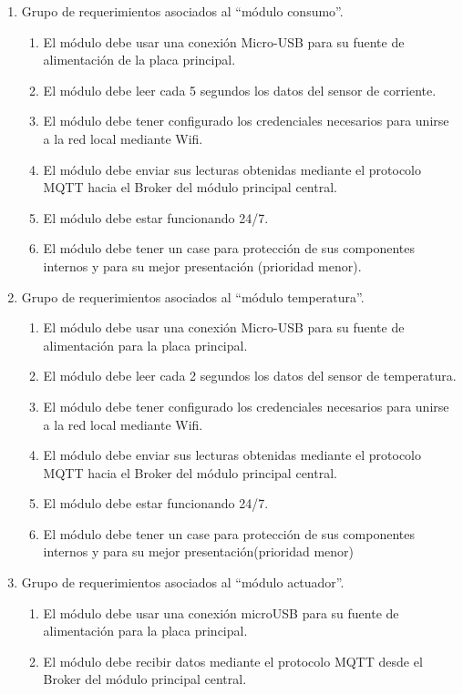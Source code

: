 \documentclass[11pt]{charter}
\begin{document}
\begin{enumerate}
\item Grupo de requerimientos asociados al ``módulo consumo''.
	\begin{enumerate}
	\item El módulo debe usar una conexión Micro-USB para su fuente de alimentación de la placa principal.
	\item El módulo debe leer cada 5 segundos los datos del sensor de corriente.
	\item El módulo debe tener configurado los credenciales necesarios para unirse a la red local mediante Wifi.
	\item El módulo debe enviar sus lecturas obtenidas mediante el protocolo MQTT hacia el Broker del módulo principal central.
	\item El módulo debe estar funcionando 24/7.
	\item El módulo debe tener un case para protección de sus componentes internos y para su mejor presentación (prioridad menor).
	\end{enumerate}	
\item Grupo de requerimientos asociados al ``módulo temperatura''.
	\begin{enumerate}
	\item El módulo debe usar una conexión Micro-USB para su fuente de alimentación para la placa principal.
	\item El módulo debe leer cada 2 segundos los datos del sensor de temperatura.
	\item El módulo debe tener configurado los credenciales necesarios para unirse a la red local mediante Wifi.
	\item El módulo debe enviar sus lecturas obtenidas mediante el protocolo MQTT hacia el Broker del módulo principal central.
	\item El módulo debe estar funcionando 24/7.
	\item El módulo debe tener un case para protección de sus componentes internos y para su mejor presentación(prioridad menor)
	\end{enumerate}	
\item Grupo de requerimientos asociados al ``módulo actuador''.
	\begin{enumerate}
	\item El módulo debe usar una conexión microUSB para su fuente de alimentación para la placa principal.
		\item El módulo debe recibir datos mediante el protocolo MQTT desde el Broker del módulo principal central.

\end{enumerate}
\end{enumerate}
\end{document}
